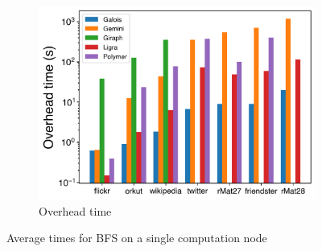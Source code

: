 \documentclass{meetings}
\begin{document}
\begin{figure}
\begin{subfigure}{0.32\textwidth}
		\includegraphics[width=\linewidth]{../../plots/singleNodeBFS_overheadTime.png}
		\caption{Overhead time}
		\label{fig:singleNodeBFS_overheadNormalized}
	\end{subfigure}
	\caption{Average times for BFS on a single computation node}
\end{figure}
\end{document}
